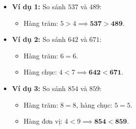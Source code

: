 \documentclass[10pt,a4paper]{article}
\begin{document}
\begin{minipage}[t]{0.49\textwidth}\vspace{0pt}
\begin{tcolorbox}[
  enhanced,
  colback=teal!4!white,
  colframe=teal!75!black,
  arc=2mm, boxrule=0.8pt,
  left=2mm, right=2mm, top=1.8mm, bottom=1.8mm,
  title={\footnotesize\bfseries\color{white}\faSliders\ 2. Ví dụ so sánh từng bước}
]
{\footnotesize
\begin{itemize}\setlength{\itemsep}{1pt}\setlength{\leftskip}{-2.5mm}
  \item \textbf{Ví dụ 1:} So sánh $537$ và $489$:
  \begin{itemize}\setlength{\itemsep}{0.5pt}\setlength{\leftskip}{-2mm}
    \item Hàng trăm: $5 > 4 \implies \mathbf{537 > 489}$.
  \end{itemize}
  \item \textbf{Ví dụ 2:} So sánh $642$ và $671$:
  \begin{itemize}\setlength{\itemsep}{0.5pt}\setlength{\leftskip}{-2mm}
    \item Hàng trăm: $6 = 6$.
    \item Hàng chục: $4 < 7 \implies \mathbf{642 < 671}$.
  \end{itemize}
  \item \textbf{Ví dụ 3:} So sánh $854$ và $859$:
  \begin{itemize}\setlength{\itemsep}{0.5pt}\setlength{\leftskip}{-2mm}
    \item Hàng trăm: $8 = 8$, hàng chục: $5 = 5$.
    \item Hàng đơn vị: $4 < 9 \implies \mathbf{854 < 859}$.
  \end{itemize}
\end{itemize}
}
\end{tcolorbox}
\end{minipage}
\end{document}

